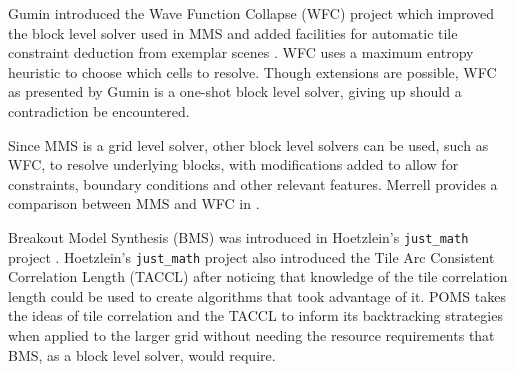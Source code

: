
Gumin introduced the Wave Function Collapse (WFC) project which improved the block level solver used in MMS
and added facilities for automatic tile constraint deduction from exemplar scenes \cite{Gumin_2016}.
WFC uses a maximum entropy heuristic to choose which cells to resolve.
Though extensions are possible, WFC as presented by Gumin is a one-shot block level solver, giving up should a contradiction be encountered.

Since MMS is a grid level solver, other block level solvers can be used, such as WFC, to resolve underlying blocks,
with modifications added to allow for constraints, boundary conditions and other relevant features.
Merrell provides a comparison between MMS and WFC in \cite{Merrell_comparison_2021}.

Breakout Model Synthesis (BMS) was introduced in Hoetzlein's \texttt{just\_math} project \cite{Hoetzlein_2023}.
Hoetzlein's \texttt{just\_math} project also introduced
the Tile Arc Consistent Correlation Length (TACCL) after noticing that knowledge of the tile correlation length could be
used to create algorithms that took advantage of it.
POMS takes the ideas of tile correlation and the TACCL to inform its backtracking strategies when applied to the larger grid
without needing the resource requirements that BMS, as a block level solver, would require.

